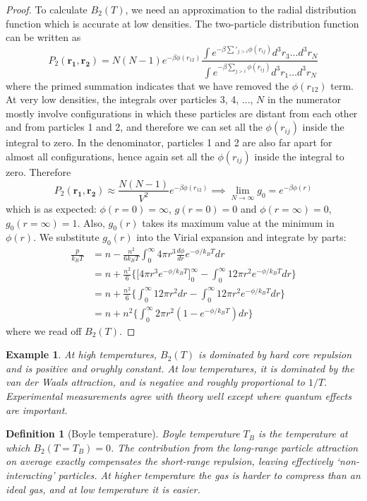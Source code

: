 \documentclass[a4paper]{article}
\newtheorem{eg}{Example}[section]
\theoremstyle{new}
\newtheorem{defi}{Definition}[section]
\begin{document}
\begin{proof}
To calculate $B_2(T)$, we need an approximation to the radial distribution function which is accurate at low densities. The two-particle distribution function can be written as
$$P_2(\mathbf{r_1},\mathbf{r_2})=N(N-1)e^{-\beta\phi(r_{12})}\frac{\int e^{-\beta\sum'_{j>i}\phi(r_{ij})}d^3r_3\dots d^3r_N}{\int e^{-\beta\sum_{j>i}\phi(r_{ij})}d^3r_1\dots d^3r_N}$$
where the primed summation indicates that we have removed the $\phi(r_{12})$ term. At very low densities, the integrals over particles 3, 4, ..., $N$ in the numerator mostly involve configurations in which these particles are distant from each other and from particles 1 and 2, and therefore we can set all the $\phi(r_{ij})$ inside the integral to zero. In the denominator, particles 1 and 2 are also far apart for almost all configurations, hence again set all the $\phi(r_{ij})$ inside the integral to zero. Therefore
$$P_2(\mathbf{r_1},\mathbf{r_2})\approx\frac{N(N-1)}{V^2}e^{-\beta\phi(r_{12})}\implies\lim_{N\rightarrow\infty}g_0=e^{-\beta\phi(r)}$$
which is as expected: $\phi(r=0)=\infty$, $g(r=0)=0$ and $\phi(r=\infty)=0$, $g_0(r=\infty)=1$. Also, $g_0(r)$ takes its maximum value at the minimum in $\phi(r)$. We substitute $g_0(r)$ into the Virial expansion and integrate by parts:
\begin{align}
    \frac{p}{k_BT}&=n-\frac{n^2}{6k_BT}\int_0^\infty 4\pi r^3\frac{d\phi}{dr}e^{-\phi/k_BT}dr\nonumber\\&=n+\frac{n^2}{6}\bigg\{\bigg[4\pi r^3e^{-\phi/k_BT}\bigg]_0^\infty-\int_0^\infty 12\pi r^2e^{-\phi/k_BT}dr\bigg\}\nonumber\\&=n+\frac{n^2}{6}\bigg\{\int_0^\infty 12\pi r^2dr-\int_0^\infty 12\pi r^2e^{-\phi/k_BT}dr\bigg\}\nonumber\\&=n+n^2\bigg\{\int_0^\infty 2\pi r^2(1-e^{-\phi/k_BT})dr\bigg\}\nonumber
\end{align}
where we read off $B_2(T)$.
\end{proof}
\begin{eg}
At high temperatures, $B_2(T)$ is dominated by hard core repulsion and is positive and orughly constant. At low temperatures, it is dominated by the van der Waals attraction, and is negative and roughly proportional to $1/T$. Experimental measurements agree with theory well except where quantum effects are important.
\end{eg}
\begin{defi}[Boyle temperature]
Boyle temperature $T_B$ is the temperature at which $B_2(T=T_B)=0$. The contribution from the long-range particle attraction on average exactly compensates the short-range repulsion, leaving effectively `non-interacting' particles. At higher temperature the gas is harder to compress than an ideal gas, and at low temperature it is easier.
\end{defi}
\end{document}
